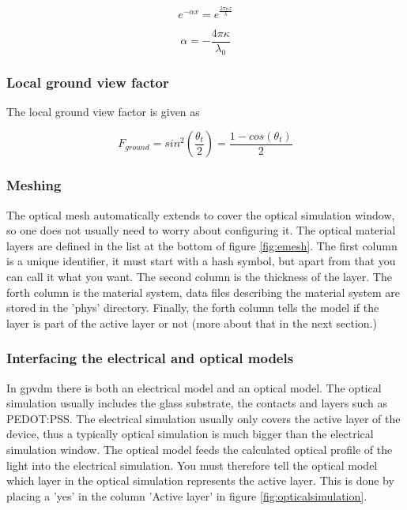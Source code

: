 \begin{equation}
e^{-\alpha x}=e^{\frac{2\pi\kappa z}{\lambda}}
\end{equation}

\begin{equation}
\alpha=-\frac{4\pi\kappa}{\lambda_0}
\end{equation}

\subsubsection{Local ground view factor}
The local ground view factor is given as \cite{neryterrain}

\begin{equation}
F_{ground}=sin^2 \left ( \frac{\theta_t}{2}\right )=\frac{1-cos(\theta_t)}{2}
\end{equation}


\subsubsection{Meshing}
The optical mesh automatically extends to cover the optical simulation window, so one does not usually need to worry about configuring it.  The optical material layers are defined in the list at the bottom of figure \ref{fig:emesh}.  The first column is a unique identifier, it must start with a hash symbol, but apart from that you can call it what you want.  The second column is the thickness of the layer.  The forth column is the material system, data files describing the material system are stored in the 'phys' directory.  Finally, the forth column tells the model if the layer is part of the active layer or not (more about that in the next section.)



\subsubsection{Interfacing the electrical and optical models}
In gpvdm there is both an electrical model and an optical model.  The optical simulation usually includes the glass substrate, the contacts and layers such as PEDOT:PSS.  The electrical simulation usually only covers the active layer of the device, thus a typically optical simulation is much bigger than the electrical simulation window.  The optical model feeds the calculated optical profile of the light into the electrical simulation.  You must therefore tell the optical model which layer in the optical simulation represents the active layer.  This is done by placing a 'yes' in the column 'Active layer' in figure \ref{fig:opticalsimulation}.
\newpage
\vfill

